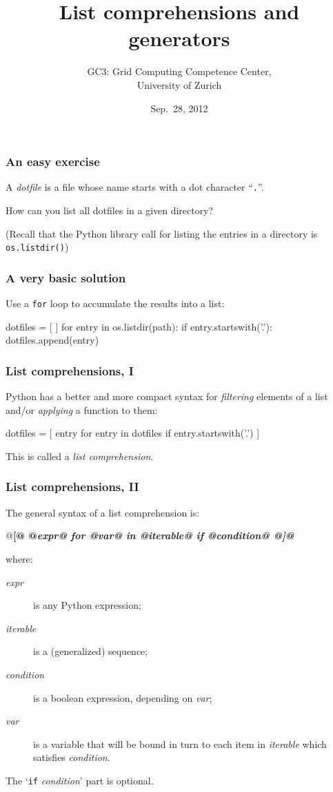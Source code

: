 \documentclass[english,serif,mathserif,xcolor=pdftex,dvipsnames,table]{beamer}
\title[Part 7]{%
  List comprehensions and generators
}
\author[GC3]{%
  GC3: Grid Computing Competence Center, \\
  University of Zurich
}
\date{Sep.~28, 2012}
\begin{document}
\maketitle


\begin{frame}
  \frametitle{An easy exercise}
  A \emph{dotfile} is a file whose name starts with a dot character
  ``\texttt{.}''.

  \+
  How can you list all dotfiles in a given directory?

  \+
  (Recall that the Python library call for listing the entries in a
  directory is \texttt{os.listdir()})
\end{frame}


\begin{frame}[fragile]
  \frametitle{A very basic solution}
  Use a \lstinline|for| loop to accumulate the results into a list:
  \begin{python}
dotfiles = [ ]
for entry in os.listdir(path):
  if entry.startswith('.'):
    dotfiles.append(entry)
  \end{python}
\end{frame}


\begin{frame}[fragile]
  \frametitle{List comprehensions, I}
  Python has a better and more compact syntax for \emph{filtering} elements
  of a list and/or \emph{applying} a function to them:
  \begin{python}
dotfiles = [ entry for entry in dotfiles 
             if entry.startswith('.') ]
  \end{python}
  
  \+ 
  This is called a \emph{list comprehension}.
\end{frame}


\begin{frame}[fragile]
  \frametitle{List comprehensions, II}
  \def\e{\ttfamily\itshape}
  
  The general syntax of a list comprehension is:
  \begin{python}
    @\bf[@ @\e expr@ for @\e var@ in @\e iterable@ if @\e condition@ @\bf]@
  \end{python}
  where:
  \begin{description}
  \item[\e expr] is any Python expression;
  \item[\e iterable] is a (generalized) sequence;
  \item[\e condition] is a boolean expression, depending on
    {\e var};
  \item[\e var] is a variable that will be bound in turn to each item
    in {\e iterable} which satisfies {\e condition}.
  \end{description}

  \+
  The `{\lstinline|if| \e condition}' part is optional.
\end{frame}
\end{document}
